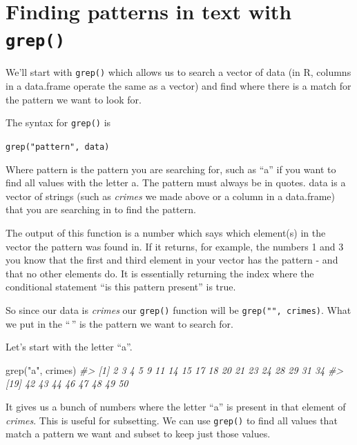 \documentclass[
]{krantz}
\makeatletter
\newenvironment{Shaded}{\begin{snugshade}}{\end{snugshade}}
\newcommand{\CommentTok}[1]{\textcolor[rgb]{0.37,0.37,0.37}{\textit{#1}}}
\newcommand{\FunctionTok}[1]{\textcolor[rgb]{0,0,0}{#1}}
\newcommand{\NormalTok}[1]{#1}
\newcommand{\StringTok}[1]{\textcolor[rgb]{0.5,0.5,0.5}{#1}}
\newenvironment{kframe}{%
\medskip{}
\setlength{\fboxsep}{.8em}
 \def\at@end@of@kframe{}%
 \ifinner\ifhmode%
  \def\at@end@of@kframe{\end{minipage}}%
  \begin{minipage}{\columnwidth}%
 \fi\fi%
 \def\FrameCommand##1{\hskip\@totalleftmargin \hskip-\fboxsep
 \colorbox{shadecolor}{##1}\hskip-\fboxsep
     \hskip-\linewidth \hskip-\@totalleftmargin \hskip\columnwidth}%
 \MakeFramed {\advance\hsize-\width
   \@totalleftmargin\z@ \linewidth\hsize
   \@setminipage}}%
 {\par\unskip\endMakeFramed%
 \at@end@of@kframe}
\renewenvironment{Shaded}{\begin{kframe}}{\end{kframe}}
\makeatother
\begin{document}
\hypertarget{finding-patterns-in-text-with-grep}{%
\section{\texorpdfstring{Finding patterns in text with
\texttt{grep()}}{Finding patterns in text with grep()}}\label{finding-patterns-in-text-with-grep}}

We'll start with \texttt{grep()} which allows us to search a
vector of data (in R, columns in a data.frame operate the
same as a vector) and find where there is a match for the
pattern we want to look for.

The syntax for \texttt{grep()} is

\texttt{grep("pattern",\ data)}

Where pattern is the pattern you are searching for, such as
``a'' if you want to find all values with the letter a. The
pattern must always be in quotes. data is a vector of
strings (such as \emph{crimes} we made above or a column in
a data.frame) that you are searching in to find the pattern.

The output of this function is a number which says which
element(s) in the vector the pattern was found in. If it
returns, for example, the numbers 1 and 3 you know that the
first and third element in your vector has the pattern - and
that no other elements do. It is essentially returning the
index where the conditional statement ``is this pattern
present'' is true.

So since our data is \emph{crimes} our \texttt{grep()}
function will be \texttt{grep("",\ crimes)}. What we put in
the ``\,'' is the pattern we want to search for.

Let's start with the letter ``a''.

\begin{Shaded}
\begin{Highlighting}[]
\FunctionTok{grep}\NormalTok{(}\StringTok{"a"}\NormalTok{, crimes)}
\CommentTok{\#\textgreater{}  [1]  2  3  4  5  9 11 14 15 17 18 20 21 23 24 28 29 31 34}
\CommentTok{\#\textgreater{} [19] 42 43 44 46 47 48 49 50}
\end{Highlighting}
\end{Shaded}

It gives us a bunch of numbers where the letter ``a'' is
present in that element of \emph{crimes}. This is useful for
subsetting. We can use \texttt{grep()} to find all values
that match a pattern we want and subset to keep just those
values.
\end{document}

